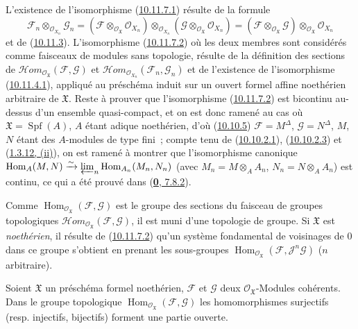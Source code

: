 L'existence de l'isomorphisme
(\hyperref[I.10.11.7.1-fr]{10.11.7.1}) résulte de la formule
\[
  \mathscr{F}_n\otimes_{\mathscr{O}_{X_n}}\mathscr{G}_n
  =
  (\mathscr{F}\otimes_{\mathscr{O}_{\mathfrak{X}}}
  \mathscr{O}_{X_n})
  \otimes_{\mathscr{O}_{X_n}}
  (\mathscr{G}\otimes_{\mathscr{O}_{\mathfrak{X}}}
  \mathscr{O}_{X_n})
  =
  (\mathscr{F}\otimes_{\mathscr{O}_{\mathfrak{X}}}\mathscr{G})
  \otimes_{\mathscr{O}_{\mathfrak{X}}}\mathscr{O}_{X_n}
\]
et de (\hyperref[I.10.11.3-fr]{10.11.3}). L'isomorphisme
(\hyperref[I.10.11.7.2-fr]{10.11.7.2}) où les deux membres sont
considérés comme faisceaux de modules sans topologie, résulte de la
définition des sections de
$\mathscr{H}\!om_{\mathscr{O}_{\mathfrak{X}}}
(\mathscr{F},\mathscr{G})$ et
$\mathscr{H}\!om_{\mathscr{O}_{X_n}}(\mathscr{F}_n,\mathscr{G}_n)$ et de
l'existence de l'isomorphisme
(\hyperref[I.10.11.4.1-fr]{10.11.4.1}), appliqué au préschéma induit sur
un ouvert formel affine noethérien arbitraire de $\mathfrak{X}$. Reste à
prouver que l'isomorphisme
(\hyperref[I.10.11.7.2-fr]{10.11.7.2}) est bicontinu au-dessus d'un
ensemble quasi-compact, et on est donc ramené au cas où
$\mathfrak{X}=\operatorname{Spf}(A)$, $A$ étant adique noethérien, d'où
(\hyperref[I.10.10.5-fr]{10.10.5})
$\mathscr{F}=M^\Delta$, $\mathscr{G}=N^\Delta$, $M$, $N$ étant des
$A$-modules de type fini~; compte tenu de
(\hyperref[I.10.10.2.1-fr]{10.10.2.1}),
(\hyperref[I.10.10.2.3-fr]{10.10.2.3}) et
(\hyperref[I.1.3.12-fr]{1.3.12, (ii)}), on est ramené à montrer que
l'isomorphisme canonique
$\operatorname{Hom}_A(M,N)\xrightarrow{\sim}
\varprojlim_n\operatorname{Hom}_{A_n}(M_n,N_n)$ (avec
$M_n=M\otimes_A A_n$, $N_n=N\otimes_A A_n$) est continu, ce qui a été
prouvé dans (\hyperref[0.7.8.2-fr]{\textbf{0}, 7.8.2}).

\begin{env}[10.11.8]
\label{I.10.11.8-fr}
Comme $\operatorname{Hom}_{\mathscr{O}_{\mathfrak{X}}}
(\mathscr{F},\mathscr{G})$ est le groupe des sections du faisceau de
groupes topologiques
$\mathscr{H}\!om_{\mathscr{O}_{\mathfrak{X}}}
(\mathscr{F},\mathscr{G})$, il est muni d'une topologie de groupe. Si
$\mathfrak{X}$ est \emph{noethérien}, il résulte de
(\hyperref[I.10.11.7.2-fr]{10.11.7.2}) qu'un système fondamental de
voisinages de $0$ dans ce groupe s'obtient en prenant les sous-groupes
$\operatorname{Hom}_{\mathscr{O}_{\mathfrak{X}}}
(\mathscr{F},\mathscr{J}^n\mathscr{G})$ ($n$ arbitraire).
\end{env}

\begin{proposition}[10.11.9]
\label{I.10.11.9-fr}
Soient $\mathfrak{X}$ un préschéma formel noethérien, $\mathscr{F}$ et
$\mathscr{G}$ deux $\mathscr{O}_{\mathfrak{X}}$-Modules cohérents. Dans
le groupe topologique
$\operatorname{Hom}_{\mathscr{O}_{\mathfrak{X}}}
(\mathscr{F},\mathscr{G})$ les homomorphismes surjectifs \textup{(resp.}
injectifs, bijectifs) forment une partie ouverte.
\end{proposition}

